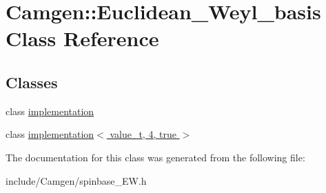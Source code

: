 \hypertarget{a00138}{\section{Camgen\-:\-:Euclidean\-\_\-\-Weyl\-\_\-basis Class Reference}
\label{a00138}
}
\subsection*{Classes}
\begin{DoxyCompactItemize}
\item 
class \hyperlink{a00284}{implementation}
\item 
class \hyperlink{a00300}{implementation$<$ value\-\_\-t, 4, true $>$}
\end{DoxyCompactItemize}


The documentation for this class was generated from the following file\-:\begin{DoxyCompactItemize}
\item 
include/\-Camgen/spinbase\-\_\-\-E\-W.\-h\end{DoxyCompactItemize}
